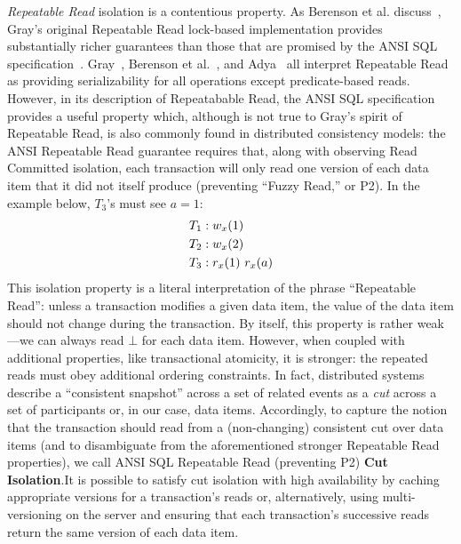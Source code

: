 \textit{Repeatable Read} isolation is a contentious property. As
Berenson et al. discuss~\cite{ansicritique}, Gray's original
Repeatable Read lock-based implementation provides substantially
richer guarantees than those that are promised by the ANSI SQL
specification~\cite{gray-isolation}. Gray~\cite{gray-isolation},
Berenson et al.~\cite{ansicritique}, and Adya~\cite{adya} all
interpret Repeatable Read as providing serializability for all
operations except predicate-based reads. However, in its description
of Repeatabable Read, the ANSI SQL specification provides a useful
property which, although is not true to Gray's spirit of Repeatable
Read, is also commonly found in distributed consistency models: the
ANSI Repeatable Read guarantee requires that, along with observing
Read Committed isolation, each transaction will only read one version
of each data item that it did not itself produce (preventing ``Fuzzy
Read,'' or P2). In the example below, $T_3$'s must see $a=1$:
\begin{align*}
\small
T_1 &: w_x(1)
\\T_2 &: w_x(2)
\\T_3 &: r_x(1)~r_x(a)
\end{align*}
This isolation property is a literal interpretation of the phrase
``Repeatable Read'': unless a transaction modifies a given data item,
the value of the data item should not change during the
transaction. By itself, this property is rather weak---we can always
read $\bot$ for each data item. However, when coupled with
additional properties, like transactional atomicity, it is stronger:
the repeated reads must obey additional ordering constraints. In fact,
distributed systems describe a ``consistent snapshot'' across a set of
related events as a \textit{cut} across a set of participants or, in
our case, data items. Accordingly, to capture the notion that the
transaction should read from a (non-changing) consistent cut over data
items (and to disambiguate from the aforementioned stronger Repeatable
Read properties), we call ANSI SQL Repeatable Read (preventing P2)
\textbf{Cut Isolation}.It is possible to satisfy cut isolation with
high availability by caching appropriate versions for a transaction's
reads or, alternatively, using multi-versioning on the server and
ensuring that each transaction's successive reads return the same
version of each data item.

